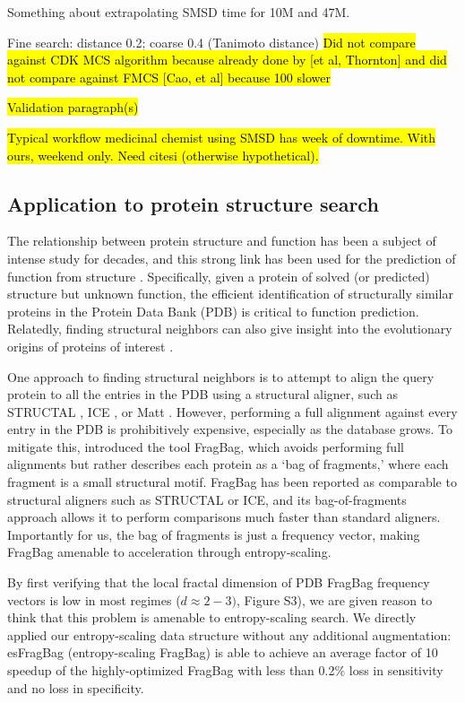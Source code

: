 \documentclass[review,preprint,12pt]{elsarticle}
\renewcommand{\cite}{\citep} %
\theoremstyle{definition}
\theoremstyle{remark}
\numberwithin{equation}{section}
\begin{document}
Something about extrapolating SMSD time for 10M and 47M.

Fine search: distance 0.2; coarse 0.4 (Tanimoto distance)
\hl{Did not compare against CDK MCS algorithm because already done by [et al, Thornton] and did not compare against FMCS [Cao, et al] because 100 slower}

\hl{Validation paragraph(s)}

\hl{Typical workflow medicinal chemist using SMSD has week of downtime. With ours, weekend only. Need citesi (otherwise hypothetical).}

\subsection{Application to protein structure search}

The relationship between protein structure and function has been a subject of intense study for decades,
and this strong link has been used for the prediction of function from structure \cite{hegyi1999relationship}.
Specifically, given a protein of solved (or predicted) structure but unknown function, the efficient identification
of structurally similar proteins in the Protein Data Bank (PDB) is critical to function prediction.
Relatedly, finding structural neighbors can also give insight into the evolutionary origins of proteins of interest \cite{yona1999protomap,nepomnyachiy2014global}.

One approach to finding structural neighbors is to attempt to align the query protein to all the entries in the PDB using a structural aligner, such as 
STRUCTAL \cite{subbiah1993structural}, ICE \cite{shindyalov1998protein}, or 
Matt \cite{menke2008matt}.
However, performing a full alignment against every entry in the PDB is prohibitively expensive, especially as the database grows.
To mitigate this, \citep{budowski2010fragbag} introduced the tool FragBag, which avoids performing full alignments but rather describes each protein as a
`bag of fragments,' where each fragment is a small structural motif.
FragBag has been reported as comparable to structural aligners such as STRUCTAL or ICE,
and its bag-of-fragments approach
allows it to perform comparisons much faster than standard aligners.
Importantly for us, the bag of fragments is just a frequency vector, making
FragBag amenable to acceleration through entropy-scaling.

By first verifying that the local fractal dimension of PDB FragBag frequency vectors is low in most regimes ($d \approx 2-3)$, Figure S3), we are given reason to think that this problem is amenable to entropy-scaling search.
We directly applied our entropy-scaling data structure without any additional 
augmentation: esFragBag (entropy-scaling FragBag) is able to achieve an average
factor of 10 speedup of the highly-optimized FragBag with less than 0.2\% loss 
in sensitivity and no loss in specificity.
\end{document}
